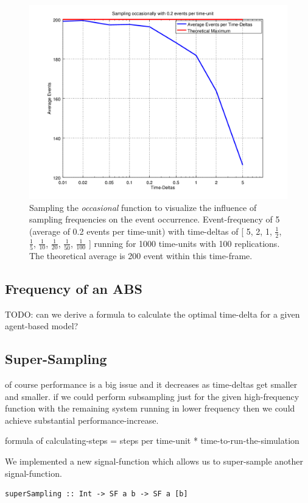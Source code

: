 \begin{figure}
	\centering
	\includegraphics[width=.6\textwidth, angle=0]{./../shared/fig/samplingTest_occasionally_02evts.png}
	\caption{Sampling the \textit{occasional} function to visualize the influence of sampling frequencies on the event occurrence. Event-frequency of 5 (average of 0.2 events per time-unit) with time-deltas of [ 5, 2, 1, $\frac{1}{2}$, $\frac{1}{5}$, $\frac{1}{10}$, $\frac{1}{20}$, $\frac{1}{50}$, $\frac{1}{100}$ ] running for 1000 time-units with 100 replications. The theoretical average is 200 event within this time-frame.}
	\label{fig:sampling_occasionally_02evts}
\end{figure}

\subsection{Frequency of an ABS}
TODO: can we derive a formula to calculate the optimal time-delta for a given agent-based model?

\subsection{Super-Sampling}
of course performance is a big issue and it decreases as time-deltas get smaller and smaller. if we could perform subsampling just for the given high-frequency function with the remaining system running in lower frequency then we could achieve substantial performance-increase.

formula of calculating-steps = steps per time-unit * time-to-run-the-simulation

We implemented a new signal-function which allows us to super-sample another signal-function.

\begin{verbatim}
superSampling :: Int -> SF a b -> SF a [b]
\end{verbatim}

